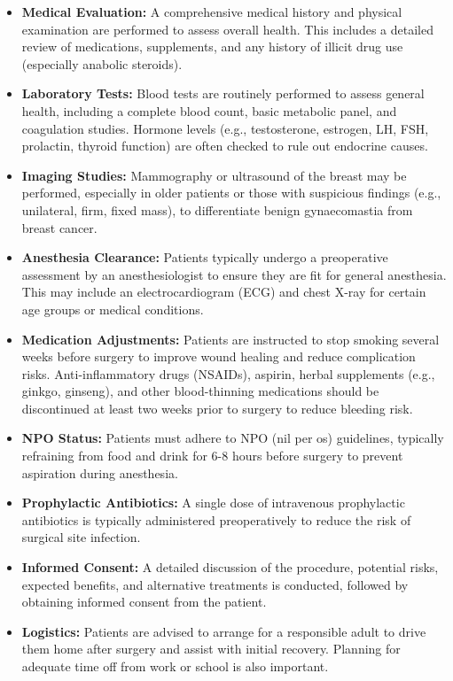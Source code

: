 \begin{itemize}
  \item \textbf{Medical Evaluation:} A comprehensive medical history and physical examination are performed to assess overall health. This includes a detailed review of medications, supplements, and any history of illicit drug use (especially anabolic steroids).
  \item \textbf{Laboratory Tests:} Blood tests are routinely performed to assess general health, including a complete blood count, basic metabolic panel, and coagulation studies. Hormone levels (e.g., testosterone, estrogen, LH, FSH, prolactin, thyroid function) are often checked to rule out endocrine causes.
  \item \textbf{Imaging Studies:} Mammography or ultrasound of the breast may be performed, especially in older patients or those with suspicious findings (e.g., unilateral, firm, fixed mass), to differentiate benign gynaecomastia from breast cancer.
  \item \textbf{Anesthesia Clearance:} Patients typically undergo a preoperative assessment by an anesthesiologist to ensure they are fit for general anesthesia. This may include an electrocardiogram (ECG) and chest X-ray for certain age groups or medical conditions.
  \item \textbf{Medication Adjustments:} Patients are instructed to stop smoking several weeks before surgery to improve wound healing and reduce complication risks. Anti-inflammatory drugs (NSAIDs), aspirin, herbal supplements (e.g., ginkgo, ginseng), and other blood-thinning medications should be discontinued at least two weeks prior to surgery to reduce bleeding risk.
  \item \textbf{NPO Status:} Patients must adhere to NPO (nil per os) guidelines, typically refraining from food and drink for 6-8 hours before surgery to prevent aspiration during anesthesia.
  \item \textbf{Prophylactic Antibiotics:} A single dose of intravenous prophylactic antibiotics is typically administered preoperatively to reduce the risk of surgical site infection.
  \item \textbf{Informed Consent:} A detailed discussion of the procedure, potential risks, expected benefits, and alternative treatments is conducted, followed by obtaining informed consent from the patient.
  \item \textbf{Logistics:} Patients are advised to arrange for a responsible adult to drive them home after surgery and assist with initial recovery. Planning for adequate time off from work or school is also important.
\end{itemize}

